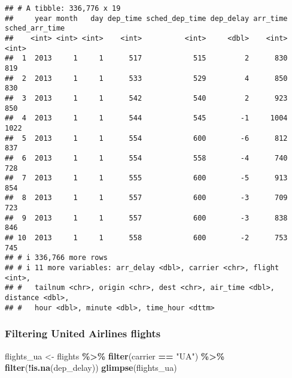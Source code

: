 \documentclass[
]{article}
\newenvironment{Shaded}{\begin{snugshade}}{\end{snugshade}}
\newcommand{\FunctionTok}[1]{\textcolor[rgb]{0.13,0.29,0.53}{\textbf{#1}}}
\newcommand{\NormalTok}[1]{#1}
\newcommand{\OtherTok}[1]{\textcolor[rgb]{0.56,0.35,0.01}{#1}}
\newcommand{\SpecialCharTok}[1]{\textcolor[rgb]{0.81,0.36,0.00}{\textbf{#1}}}
\newcommand{\StringTok}[1]{\textcolor[rgb]{0.31,0.60,0.02}{#1}}
\begin{document}
\begin{verbatim}
## # A tibble: 336,776 x 19
##     year month   day dep_time sched_dep_time dep_delay arr_time sched_arr_time
##    <int> <int> <int>    <int>          <int>     <dbl>    <int>          <int>
##  1  2013     1     1      517            515         2      830            819
##  2  2013     1     1      533            529         4      850            830
##  3  2013     1     1      542            540         2      923            850
##  4  2013     1     1      544            545        -1     1004           1022
##  5  2013     1     1      554            600        -6      812            837
##  6  2013     1     1      554            558        -4      740            728
##  7  2013     1     1      555            600        -5      913            854
##  8  2013     1     1      557            600        -3      709            723
##  9  2013     1     1      557            600        -3      838            846
## 10  2013     1     1      558            600        -2      753            745
## # i 336,766 more rows
## # i 11 more variables: arr_delay <dbl>, carrier <chr>, flight <int>,
## #   tailnum <chr>, origin <chr>, dest <chr>, air_time <dbl>, distance <dbl>,
## #   hour <dbl>, minute <dbl>, time_hour <dttm>
\end{verbatim}

\subsubsection{Filtering United Airlines
flights}\label{filtering-united-airlines-flights}

\begin{Shaded}
\begin{Highlighting}[]
\NormalTok{flights\_ua }\OtherTok{\textless{}{-}}\NormalTok{ flights }\SpecialCharTok{\%\textgreater{}\%}
  \FunctionTok{filter}\NormalTok{(carrier }\SpecialCharTok{==} \StringTok{"UA"}\NormalTok{) }\SpecialCharTok{\%\textgreater{}\%}
  \FunctionTok{filter}\NormalTok{(}\SpecialCharTok{!}\FunctionTok{is.na}\NormalTok{(dep\_delay))}
\FunctionTok{glimpse}\NormalTok{(flights\_ua)}
\end{Highlighting}
\end{Shaded}
\end{document}
